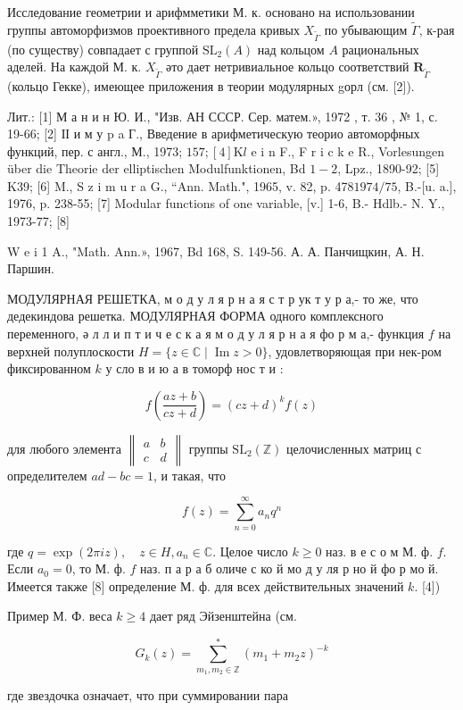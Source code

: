 \documentclass[10pt]{article}
\begin{document}
Исследование геометрии и арифмметики М. к. основано на использовании группы автоморфизмов проективного предела кривых $X_{\tilde{\Gamma}}$ по убывающим $\tilde{\Gamma}$, к-рая (по существу) совпадает с группой $\mathrm{SL}_{2}(A)$ над кольцом $A$ рациональных аделей. На каждой $М$. к. $X_{\tilde{\Gamma}}$ әто дает нетривиальное кольцо соответствий $\boldsymbol{R}_{\tilde{\Gamma}}$ (кольцо Гекке), имеющее приложения в теории модулярных gорл (см. [2]).



Лит.: [1] М а н и н Ю. И., "Изв. АН СССР. Сер. матем.», 1972 , т. 36 , № 1, с. 19-66; [2] ІІ и м у p a Г., Введение в арифметическую теорио автоморфных функций, пер. с англ., М., 1973; $157 ;[4] \mathrm{K} l$ e i n F., F r i c k e R., Vorlesungen über die Theorie der elliptischen Modulfunktionen, Bd $1-2$, Lpz., 1890-92; [5] K39; [6] M., S z i m u r a G., “Ann. Math.", 1965, v. 82, p. 478$1974 / 75$, B.-[u. a.], 1976, p. 238-55; [7] Modular functions of one variable, [v.] 1-6, B.- Hdlb.- N. Y., 1973-77; [8]

W e i 1 A., "Math. Ann.», 1967, Bd 168, S. 149-56. А. А. Панчищкин, А. Н. Паршин.



МОДУЛЯРНАЯ РЕШЕТКА, м о д у л я р н а я с т р ук т у р а,- то же, что дедекиндова решетка. МОДУЛЯРНАЯ ФОРМА одного комплексного переменного, ә л л и п т и ч е с к а я м о д у л я р н а я фо р м а,- функция $f$ на верхней полуплоскости $H=\{z \in \mathbb{C} \mid \operatorname{Im} z>0\}$, удовлетворяющая при нек-ром фиксированном $k$ у сло в и ю а в томорф нос т и :



\[

f\left(\frac{a z+b}{c z+d}\right)=(c z+d)^{k} f(z)

\]



для любого элемента $\left\|\begin{array}{ll}a & b \\ c & d\end{array}\right\|$ группы $\mathrm{SL}_{2}(\mathbb{Z})$ целочисленных матриц с определителем $a d-b c=1$, и такая, что



\[

f(z)=\sum_{n=0}^{\infty} a_{n} q^{n}

\]



где $q=\exp (2 \pi i z), \quad z \in H, a_{n} \in \mathbb{C}$. Целое число $k \geqslant 0$ наз. в е с о м М. ф. $f$. Если $a_{0}=0$, то М. ф. $f$ наз. п а р а б оличе с ко й мо д у ля р но й фо р мо й. Имеется также [8] определение М. ф. для всех действительных значений $k$. [4])



Пример М. Ф. веса $k \geqslant 4$ дает ряд Эйзенштейна (см.



\[

G_{k}(z)=\sum_{m_{1}, m_{2} \in \mathbb{Z}}^{*}\left(m_{1}+m_{2} z\right)^{-k}

\]



где звездочка означает, что при суммировании пара
\end{document}
